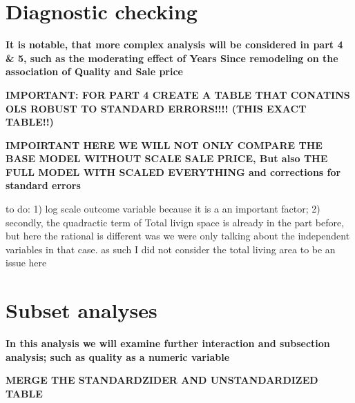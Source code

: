 \documentclass[a4paper]{article}
\begin{document}
\section{Diagnostic checking}
\textbf{It is notable, that more complex analysis will be considered in part 4 \& 5, such as the moderating effect of Years Since remodeling on the association of Quality and Sale price}

\textbf{IMPORTANT: FOR PART 4 CREATE A TABLE THAT CONATINS OLS ROBUST TO STANDARD ERRORS!!!! (THIS EXACT TABLE!!)}

\textbf{IMPOIRTANT HERE WE WILL NOT ONLY COMPARE THE BASE MODEL WITHOUT SCALE SALE PRICE, But also THE FULL MODEL WITH SCALED EVERYTHING and corrections for standard errors }

to do: 1) log scale outcome variable because it is a an important factor; 2) secondly, the quadractic term of Total livign space is already in the part before, but here the rational is different was we were only talking about the independent variables in that case. as such I did not consider the total living area to be an issue here 




\section{Subset analyses}
\textbf{In this analysis we will examine further interaction and subsection analysis; such as quality as a numeric variable}














 
 

\textbf{MERGE THE STANDARDZIDER AND UNSTANDARDIZED TABLE}
\end{document}
